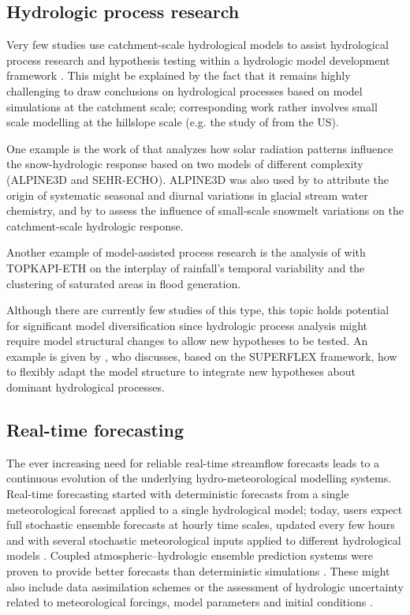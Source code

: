 \documentclass[10pt,a4paper]{article}
\begin{document}
\subsection{Hydrologic process research}
\label{sec:application:process}

Very few studies use catchment-scale hydrological models to assist
hydrological process research and hypothesis testing within a hydrologic
model development framework \citep{clarkOpinion2016}. This might be explained
by the fact that it remains highly challenging to draw conclusions on
hydrological processes based on model simulations at the catchment
scale; corresponding work rather involves small scale modelling at the
hillslope scale (e.g. the study of \citealt{Heuvel2018} from the US). 

One example is the work of \citet{Comola2017} that analyzes how solar
radiation patterns influence the snow-hydrologic response based on two
models of different complexity (ALPINE3D and SEHR-ECHO). ALPINE3D was
also used by \citet{Hindshaw2011} to attribute the origin of systematic
seasonal and diurnal variations in glacial stream water chemistry, and
by \citet{Brauchli2017} to assess the influence of small-scale snowmelt
variations on the catchment-scale hydrologic response.

Another example of model-assisted process research is the analysis
of \citet{Paschalis_2014} with TOPKAPI-ETH on the interplay of rainfall's
temporal variability and the clustering of saturated areas in flood
generation.

Although there are currently few studies of this type, this topic holds
potential for significant model diversification since hydrologic process
analysis might require model structural changes to allow new hypotheses
to be tested. An example is given by \citet{DalMolin2020}, who discusses,
based on the SUPERFLEX framework, how to flexibly adapt the model
structure to integrate new hypotheses about dominant hydrological
processes.

\subsection{Real-time forecasting}
\label{sec:application:forecasting}

The ever increasing need for reliable real-time streamflow forecasts
leads to a continuous evolution of the underlying hydro-meteorological
modelling systems. Real-time forecasting started with deterministic
forecasts from a single meteorological forecast applied to a single
hydrological model; today, users expect full stochastic ensemble
forecasts at hourly time scales, updated every few hours and with
several stochastic meteorological inputs applied to different
hydrological models \citep{Karsten2016}. Coupled atmospheric--hydrologic
ensemble prediction systems were proven to provide better forecasts
than deterministic simulations \citep{Verbunt2007,Zappa2008,Jaun2008a,Liechti2013}.
These might also include data assimilation schemes \citep{J_rg_Hess_2015} or the assessment
of hydrologic uncertainty related to meteorological forcings, model
parameters and initial conditions \citep{Zappa2011a,Fundel2011}.
\end{document}
